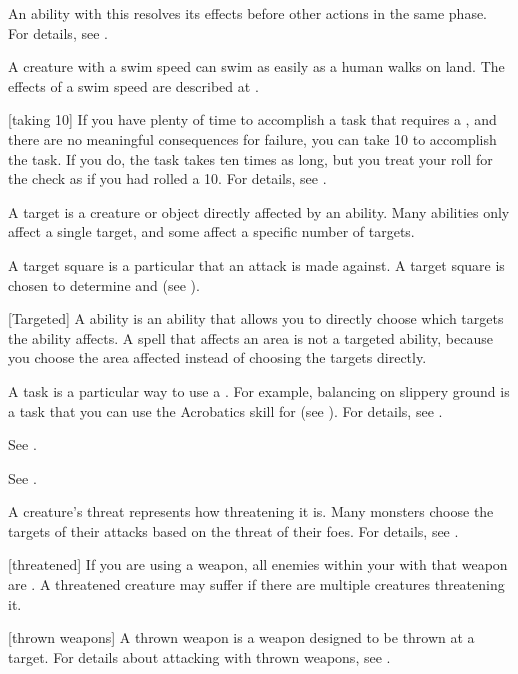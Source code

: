  An ability with this  resolves its effects before other actions in the same phase.
For details, see .

 A creature with a swim speed can swim as easily as a human walks on land.
The effects of a swim speed are described at .

[taking 10] If you have plenty of time to accomplish a task that requires a , and there are no meaningful consequences for failure, you can take 10 to accomplish the task.
If you do, the task takes ten times as long, but you treat your roll for the check as if you had rolled a 10.
For details, see .

 A target is a creature or object directly affected by an ability.
Many abilities only affect a single target, and some affect a specific number of targets.

 A target square is a particular  that an attack is made against.
A target square is chosen to determine  and  (see ).

[Targeted] A  ability is an ability that allows you to directly choose which targets the ability affects.
A spell that affects an area is not a targeted ability, because you choose the area affected instead of choosing the targets directly.

 A task is a particular way to use a .
For example, balancing on slippery ground is a task that you can use the Acrobatics skill for (see ).
For details, see .

 See .

 See .

 A creature's threat represents how threatening it is.
Many monsters choose the targets of their attacks based on the threat of their foes.
For details, see .

[threatened] If you are using a  weapon, all enemies within your  with that weapon are .
A threatened creature may suffer  if there are multiple creatures threatening it.

[thrown weapons] A thrown weapon is a weapon designed to be thrown at a target.
For details about attacking with thrown weapons, see .

